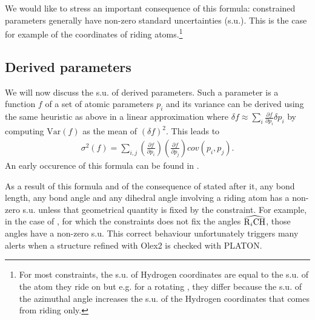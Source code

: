 \documentclass[pdf]{iucr}
\newcommand{\var}[1]{\mathrm{Var}\left(#1\right)}
\newcommand{\partialder}[2]{\frac{\partial #1}{\partial #2}}
\begin{document}
We would like to stress an important consequence of this formula: constrained parameters generally have non-zero standard uncertainties (s.u.). This is the case for example of the coordinates of riding atoms.\footnote{For most constraints, the s.u. of Hydrogen coordinates are equal to the s.u. of the atom they ride on but e.g. for a rotating , they differ because the s.u. of the azimuthal angle increases the s.u. of the Hydrogen coordinates that comes from riding only.} 

\subsection{Derived parameters}

We will now discuss the s.u. of derived parameters. Such a parameter is a function $f$ of a set of atomic parameters $p_i$ and its variance can be derived using the same heuristic as above in a linear approximation where $\delta f \approx \sum_i \partialder{f}{p_i} \delta p_i$ by computing $\var{f}$ as the mean of $(\delta f)^2$. This leads to
\begin{align}
\sigma^2(f) = \sum_{i,j}{\left(\partialder{f}{p_i}\right) \left(\partialder{f}{p_j}\right) cov(p_i,p_j)}.
\label{eqn:sigma_f}
\end{align}
An early occurence of this formula can be found in .

As a result of this formula and of the consequence of  stated after it, any bond length, any bond angle and any dihedral angle involving a riding atom has a non-zero s.u. unless that geometrical quantity is fixed by the constraint. For example, in the case of , for which the constraints does not fix the angles $\widehat{\ce{R$_i$CH}}$, those angles have a non-zero s.u. This correct behaviour unfortunately triggers many alerts when a structure refined with Olex2 is checked with PLATON. 
\end{document}
